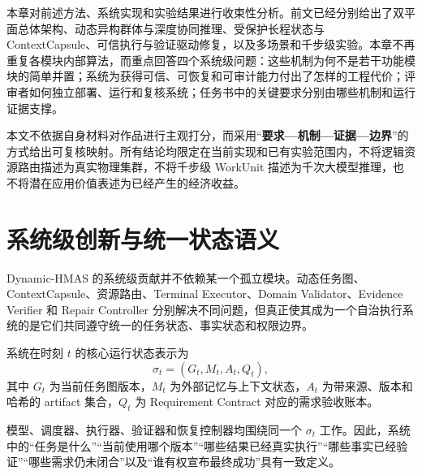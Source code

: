 \documentclass[UTF8,a4paper,12pt,oneside]{ctexbook}
\begin{document}
本章对前述方法、系统实现和实验结果进行收束性分析。前文已经分别给出了双平面总体架构、动态异构群体与深度协同推理、受保护长程状态与 ContextCapsule、可信执行与验证驱动修复，以及多场景和千步级实验。本章不再重复各模块内部算法，而重点回答四个系统级问题：这些机制为何不是若干功能模块的简单并置；系统为获得可信、可恢复和可审计能力付出了怎样的工程代价；评审者如何独立部署、运行和复核系统；任务书中的关键要求分别由哪些机制和运行证据支撑。

本文不依据自身材料对作品进行主观打分，而采用“\textbf{要求—机制—证据—边界}”的方式给出可复核映射。所有结论均限定在当前实现和已有实验范围内，不将逻辑资源路由描述为真实物理集群，不将千步级 WorkUnit 描述为千次大模型推理，也不将潜在应用价值表述为已经产生的经济收益。


\section{系统级创新与统一状态语义}

Dynamic-HMAS 的系统级贡献并不依赖某一个孤立模块。动态任务图、ContextCapsule、资源路由、Terminal Executor、Domain Validator、Evidence Verifier 和 Repair Controller 分别解决不同问题，但真正使其成为一个自治执行系统的是它们共同遵守统一的任务状态、事实状态和权限边界。

系统在时刻 $t$ 的核心运行状态表示为
\[
\sigma_t=(G_t,M_t,A_t,Q_t),
\]
其中 $G_t$ 为当前任务图版本，$M_t$ 为外部记忆与上下文状态，$A_t$ 为带来源、版本和哈希的 artifact 集合，$Q_t$ 为 Requirement Contract 对应的需求验收账本。

模型、调度器、执行器、验证器和恢复控制器均围绕同一个 $\sigma_t$ 工作。因此，系统中的“任务是什么”“当前使用哪个版本”“哪些结果已经真实执行”“哪些事实已经验证”“哪些需求仍未闭合”以及“谁有权宣布最终成功”具有一致定义。
\end{document}
